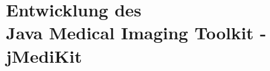 \stopthumb
\part[Entwicklung des Java Medical Imaging Toolkit]{Entwicklung des \\ Java Medical Imaging Toolkit - \\ jMediKit}